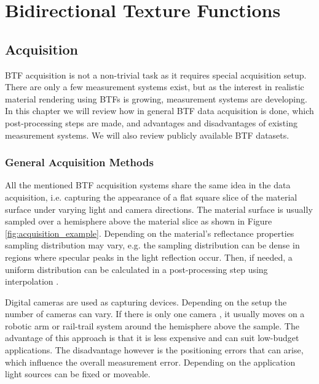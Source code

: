 \chapter{Bidirectional Texture Functions}
\label{chapter:stateOfArt}


\section{Acquisition}
\label{chapter:acquisition}

BTF acquisition is not a non-trivial task as it requires special acquisition setup. 
There are only a few measurement systems \cite{star2004,schwartz,dana,Kaleidoscope,Koudelka,statistical_acq} exist, but as the interest in realistic material rendering using BTFs is growing, measurement systems are developing.
In this chapter we will review how in general BTF data acquisition is done, which post-processing steps are made, and advantages and disadvantages of existing measurement systems. 
We will also review publicly available BTF datasets.

\subsection{General Acquisition Methods}
\label{section:General_acquisition}	
All the mentioned BTF acquisition systems share the same idea in the data acquisition, i.e. capturing the appearance of a flat square slice of the material surface under varying light and camera directions.
The material surface is usually sampled over a hemisphere above the material slice as shown in Figure \ref{fig:acquisition_example}.
Depending on the material's reflectance properties sampling distribution may vary, e.g. the sampling distribution can be dense in regions where specular peaks in the light reflection occur. 
Then, if needed, a uniform distribution can be calculated in a post-processing step using interpolation \cite{haindl_visual}.

Digital cameras are used as capturing devices. Depending on the setup the number of cameras can vary.
 If there is only one camera \cite{star2004,statistical_acq,dana}, it usually moves on a robotic arm or rail-trail system around the hemisphere above the sample\cite{star2004}. 
 The advantage of this approach is that it is less expensive and can suit low-budget applications.
The disadvantage however is the positioning errors that can arise, which influence the overall measurement error. 
Depending on the application light sources can be fixed or moveable.

